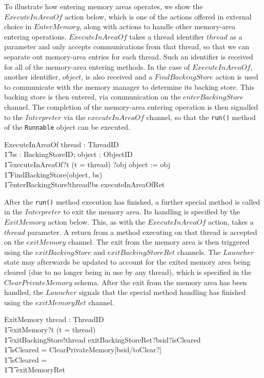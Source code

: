 To illustrate how entering memory areas operates, we show the
$ExecuteInAreaOf$ action below, which is one of the actions offered in
external choice in $EnterMemory$, along with actions to handle other
memory-area entering operations.
$ExecuteInAreaOf$ takes a thread identifier $thread$ as a parameter
and only accepts communications from that thread, so that we can
separate out memory-area entries for each thread.
Such an identifier is received for all of the memory-area entering
methods.
In the case of $ExecuteInAreaOf$, another identifier, $object$, is
also received and a $FindBackingStore$ action is used to communicate
with the memory manager to determine its backing store.
This backing store is then entered, via communication on the
$enterBackingStore$ channel.
The completion of the memory-area entering operation is then signalled
to the $Interpreter$ via the $executeInAreaOf$ channel, so that the
\texttt{run()} method of the \texttt{Runnable} object can be executed.
\begin{circusaction}
  ExecuteInAreaOf \circdef \circval thread : ThreadID \circspot \\
  \t1 \circvar bs : BackingStoreID; object : ObjectID \circspot \\
  \t1 executeInAreaOf?t \prefixcolon (t = thread) ?obj \then object := obj \circseq \\
  \t1 FindBackingStore(object, bs) \circseq \\
  \t1 enterBackingStore!thread!bs \then executeInAreaOfRet \then \Skip
\end{circusaction}

After the \texttt{run()} method execution has finished, a further
special method is called in the $Interpreter$ to exit the memory area. 
Its handling is specified by the $ExitMemory$ action below.
This, as with the $ExecuteInAreaOf$ action, takes a $thread$
parameter.
A return from a method executing on that thread is accepted on the
$exitMemory$ channel.
The exit from the memory area is then triggered using the
$exitBackingStore$ and $exitBackingStoreRet$ channels.
The $Launcher$ state may afterwards be updated to account for the
exited memory area being cleared (due to no longer being in use by any
thread), which is specified in the $ClearPrivateMemory$ schema.
After the exit from the memory area has been handled, the $Launcher$
signals that the special method handling has finished using the
$exitMemoryRet$ channel.
\begin{circusaction}
  ExitMemory \circdef \circval thread : ThreadID \circspot \\
  \t1 exitMemory?t \prefixcolon (t = thread) \\
  \t1 {} \then exitBackingStore!thread \then exitBackingStoreRet?bsid?isCleared \then {} \\
  \t1 \circif isCleared = \true \circthen \lschexpract ClearPrivateMemory[bsid/toClear?] \rschexpract \\
  \t1 {} \circelse isCleared = \false \circthen \Skip \\
  \t1 \circfi \circseq
  \t1 exitMemoryRet \then \Skip
\end{circusaction}

